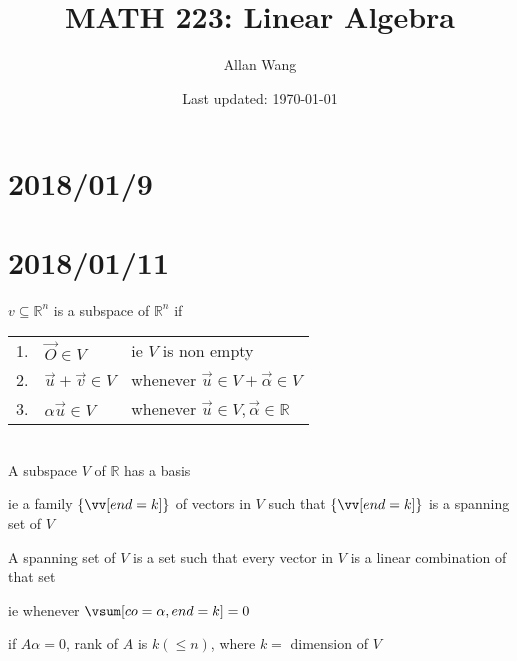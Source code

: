 \documentclass[12pt]{article}
\author{Allan Wang}
\date{Last updated: \today}
\title{MATH 223: Linear Algebra}
\newcommand{\real}[0]{\mathbb{R}}
\newcommand{\bb}[1]{\left\{#1\right\}}
\begin{document}
\onehalfspacing
\maketitle
\tableofcontents
\pagebreak
\section{2018/01/9}


\section{2018/01/11}

$v \subseteq \real^n$ is a subspace of $\real^n$ if \\

\begin{tabular}{@{}l l l}
	1. & $\vec{O} \in V$ & ie $V$ is non empty \\
	2. & $\vec{u} + \vec{v} \in V$ & whenever $\vec{u} \in V + \vec{\alpha} \in V$ \\
	3. & $\alpha \vec{u} \in V$ & whenever $\vec{u} \in V, \vec{\alpha} \in \real$	
\end{tabular} \\

A subspace $V$ of $\real$ has a basis

ie a family $\bb{\vv[end=k]}$ of vectors in $V$ such that $\bb{\vv[end=k]}$ is a spanning set of $V$

A spanning set of $V$ is a set such that every vector in $V$ is a linear combination of that set

ie whenever $\vsum[co=\alpha,end=k] = 0$

if $A\alpha = 0$, rank of $A$ is $k (\le n)$, where $k =$ dimension of $V$
\end{document}
